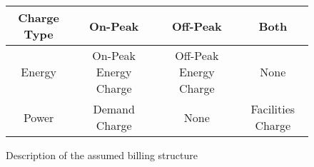 \begin{figure*}
	\centering
	\begin{tabular}{c | c c c}
		Charge Type & On-Peak               & Off-Peak               & Both \\ \hline
		Energy      & On-Peak Energy Charge & Off-Peak Energy Charge & None \\
		Power       & Demand Charge         & None                   & Facilities Charge 
	\end{tabular}
	\caption{Description of the assumed billing structure}
	\label{fig:charges}
\end{figure*}
